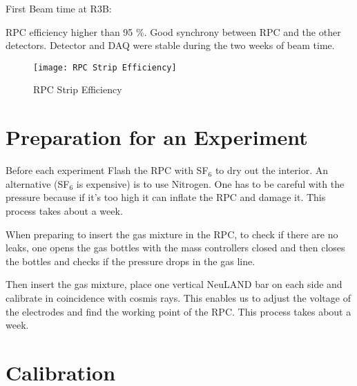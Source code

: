 First Beam time at \gls{R3B}:

RPC eﬃciency higher than 95 \%.
Good synchrony between RPC and the other detectors.
Detector and DAQ were stable during the two weeks of beam time.

\begin{figure}
	\texttt{[image: RPC Strip Efficiency]}
	\caption{RPC Strip Efficiency}
	\label{fig:RPCStripEff}
\end{figure}


\section{Preparation for an Experiment}


Before each experiment
Flash the RPC with SF$_6$ to dry out the interior. An alternative (SF$_6$ is expensive) is to use Nitrogen. One has to be careful with the pressure because if it's too high it can inflate the RPC and damage it.
This process takes about a week.

When preparing to insert the gas mixture in the RPC, to check if there are no leaks, one opens the gas bottles with the mass controllers closed and then closes the bottles and checks if the pressure drops in the gas line.

Then insert the gas mixture, place one vertical NeuLAND bar on each side and calibrate in coincidence with cosmis rays. This enables us to adjust the voltage of the electrodes and find the working point of the RPC.
This process takes about a week.


\section{Calibration}
